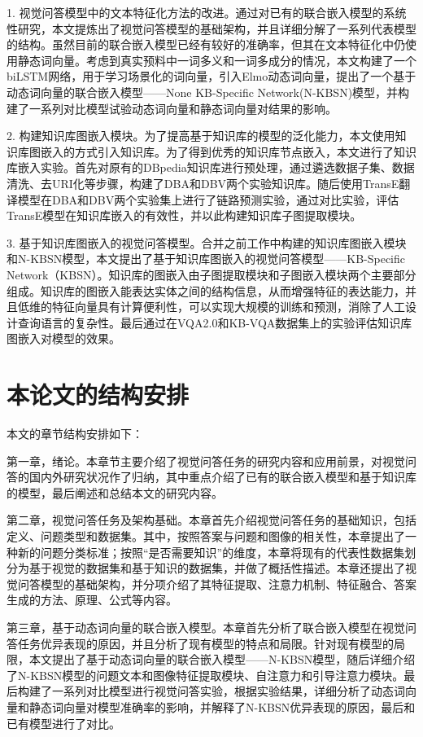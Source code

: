 1. 视觉问答模型中的文本特征化方法的改进。通过对已有的联合嵌入模型的系统性研究，本文提炼出了视觉问答模型的基础架构，并且详细分解了一系列代表模型的结构。虽然目前的联合嵌入模型已经有较好的准确率，但其在文本特征化中仍使用静态词向量。考虑到真实预料中一词多义和一词多成分的情况，本文构建了一个biLSTM网络，用于学习场景化的词向量，引入Elmo动态词向量，提出了一个基于动态词向量的联合嵌入模型——None KB-Specific Network(N-KBSN)模型，并构建了一系列对比模型试验动态词向量和静态词向量对结果的影响。

2. 构建知识库图嵌入模块。为了提高基于知识库的模型的泛化能力，本文使用知识库图嵌入的方式引入知识库。为了得到优秀的知识库节点嵌入，本文进行了知识库嵌入实验。首先对原有的DBpedia知识库进行预处理，通过遴选数据子集、数据清洗、去URI化等步骤，构建了DBA和DBV两个实验知识库。随后使用TransE翻译模型在DBA和DBV两个实验集上进行了链路预测实验，通过对比实验，评估TransE模型在知识库嵌入的有效性，并以此构建知识库子图提取模块。

3. 基于知识库图嵌入的视觉问答模型。合并之前工作中构建的知识库图嵌入模块和N-KBSN模型，本文提出了基于知识库图嵌入的视觉问答模型——KB-Specific Network（KBSN）。知识库的图嵌入由子图提取模块和子图嵌入模块两个主要部分组成。知识库的图嵌入能表达实体之间的结构信息，从而增强特征的表达能力，并且低维的特征向量具有计算便利性，可以实现大规模的训练和预测，消除了人工设计查询语言的复杂性。最后通过在VQA2.0和KB-VQA数据集上的实验评估知识库图嵌入对模型的效果。

\section{本论文的结构安排}
本文的章节结构安排如下：

第一章，绪论。本章节主要介绍了视觉问答任务的研究内容和应用前景，对视觉问答的国内外研究状况作了归纳，其中重点介绍了已有的联合嵌入模型和基于知识库的模型，最后阐述和总结本文的研究内容。

第二章，视觉问答任务及架构基础。本章首先介绍视觉问答任务的基础知识，包括定义、问题类型和数据集。其中，按照答案与问题和图像的相关性，本章提出了一种新的问题分类标准；按照“是否需要知识”的维度，本章将现有的代表性数据集划分为基于视觉的数据集和基于知识的数据集，并做了概括性描述。本章还提出了视觉问答模型的基础架构，并分项介绍了其特征提取、注意力机制、特征融合、答案生成的方法、原理、公式等内容。

第三章，基于动态词向量的联合嵌入模型。本章首先分析了联合嵌入模型在视觉问答任务优异表现的原因，并且分析了现有模型的特点和局限。针对现有模型的局限，本文提出了基于动态词向量的联合嵌入模型——N-KBSN模型，随后详细介绍了N-KBSN模型的问题文本和图像特征提取模块、自注意力和引导注意力模块。最后构建了一系列对比模型进行视觉问答实验，根据实验结果，详细分析了动态词向量和静态词向量对模型准确率的影响，并解释了N-KBSN优异表现的原因，最后和已有模型进行了对比。

